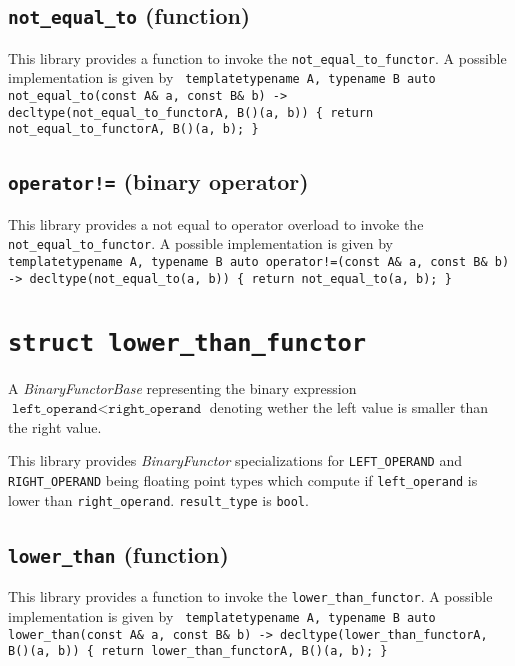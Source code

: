 \documentclass[oneside]{book}
\begin{document}
\subsection{\texttt{not\_equal\_to} (function)}
This library provides a function to invoke the \texttt{not\_equal\_to\_functor}.
A possible implementation is given by\newline
\texttt{
template\textlangle typename A, typename B\textrangle\newline
auto not\_equal\_to(const A\& a, const B\& b)\newline
-> decltype(not\_equal\_to\_functor\textlangle A, B\textrangle()(a, b))\newline
\{ return not\_equal\_to\_functor\textlangle A, B\textrangle()(a, b); \}
}

\subsection{\texttt{operator!=} (binary operator)}
This library provides a not equal to operator overload to invoke the \texttt{not\_equal\_to\_functor}.
A possible implementation is given by\newline
\texttt{
template\textlangle typename A, typename B\textrangle\newline
auto operator!=(const A\& a, const B\& b)\newline
-> decltype(not\_equal\_to(a, b))\newline
\{ return not\_equal\_to(a, b); \}
}

\section{\texttt{struct lower\_than\_functor}}
A \textit{BinaryFunctorBase} representing the binary expression
$\texttt{left\_operand} < \texttt{right\_operand}$
denoting wether the left value is smaller than the right value.\newline

\noindent{}This library provides \textit{BinaryFunctor}         specializations for
\texttt{LEFT\_OPERAND} and   \texttt{RIGHT\_OPERAND} being     floating point types
which compute if \texttt{left\_operand}      is lower than \texttt{right\_operand}.
\texttt{result\_type} is \texttt{bool}.

\subsection{\texttt{lower\_than} (function)}
This library provides a function to invoke the \texttt{lower\_than\_functor}.
A possible implementation is given by\newline
\texttt{
template\textlangle typename A, typename B\textrangle\newline
auto lower\_than(const A\& a, const B\& b)\newline
-> decltype(lower\_than\_functor\textlangle A, B\textrangle()(a, b))\newline
\{ return lower\_than\_functor\textlangle A, B\textrangle()(a, b); \}
}
\end{document}
